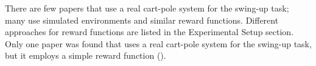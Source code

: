 There are few papers that use a real cart-pole system for the swing-up task; many use simulated environments and similar reward functions. Different approaches for reward functions are listed in the Experimental Setup section. Only one paper was found that uses a real cart-pole system for the swing-up task, but it employs a simple reward function (\cite{nayante_reinforcement_2021}).
